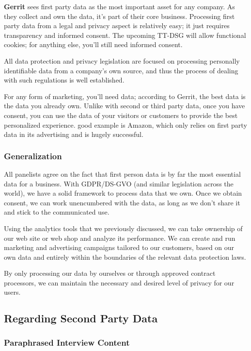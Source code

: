 \textbf{Gerrit} sees first party data as the most important asset for any company. As they collect and own the data, it's part of their core business. Processing first party data from a legal and privacy aspect is relatively easy; it just requires transparency and informed consent. The upcoming TT-DSG will allow functional cookies; for anything else, you'll still need informed consent. 

All data protection and privacy legislation are focused on processing personally identifiable data from a company's own source, and thus the process of dealing with such regulations is well established.

For any form of marketing, you'll need data; according to Gerrit, the best data is the data you already own. Unlike with second or third party data, once you have consent, you can use the data of your visitors or customers to provide the best personalized experience.  good example is Amazon, which only relies on first party data in its advertising and is hugely successful.

\subsubsection{Generalization}

All panelists agree on the fact that first person data is by far the most essential data for a business. With GDPR/DS-GVO (and similar legislation across the world), we have a solid framework to process data that we own. Once we obtain consent, we can work unencumbered with the data, as long as we don't share it and stick to the communicated use.

Using the analytics tools that we previously discussed, we can take ownership of our web site or web shop and analyze its performance. We can create and run marketing and advertising campaigns tailored to our customers, based on our own data and entirely within the boundaries of the relevant data protection laws.

By only processing our data by ourselves or through approved contract processors, we can maintain the necessary and desired level of privacy for our users.

\subsection{Regarding Second Party Data}

\subsubsection{Paraphrased Interview Content}

